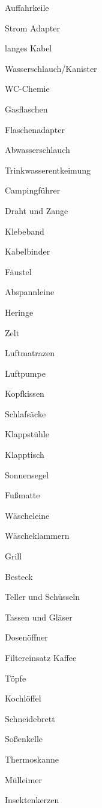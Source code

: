 \begin{ONEitemize}
    \item{Auffahrkeile}
    \item{Strom Adapter}
    \item{langes Kabel}
    \item{Wasserschlauch/Kanister}
    \item{WC-Chemie}
    \item{Gasflaschen}
    \item{Flaschenadapter}
    \item{Abwasserschlauch}
    \item{Trinkwasserentkeimung}
    \item{Campingführer}
    \item{Draht und Zange}
    \item{Klebeband}
    \item{Kabelbinder}
    \item{Fäustel}
    \item{Abspannleine}
    \item{Heringe}
    \item{Zelt}
    \item{Luftmatrazen}
    \item{Luftpumpe}
    \item{Kopfkissen}
    \item{Schlafsäcke}
    \item{Klappstühle}
    \item{Klapptisch}
    \item{Sonnensegel}
    \item{Fußmatte}
    \item{Wäscheleine}
    \item{Wäscheklammern}
    \item{Grill}
    \item{Besteck}
    \item{Teller und Schüsseln}
    \item{Tassen und Gläser}
    \item{Dosenöffner}
    \item{Filtereinsatz Kaffee}
    \item{Töpfe}
    \item{Kochlöffel}
    \item{Schneidebrett}
    \item{Soßenkelle}
    \item{Thermoskanne}
    \item{Mülleimer}
    \item{Insektenkerzen}

\end{ONEitemize}
